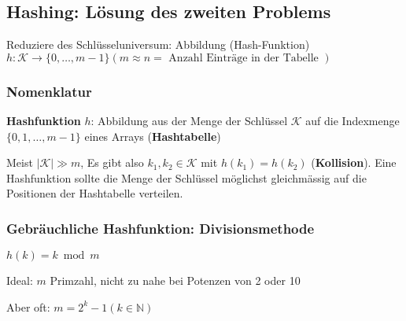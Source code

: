 \documentclass[german]{latex4ei/latex4ei_sheet}
\begin{document}
\begin{sectionbox}
\subsection{Hashing: Lösung des zweiten Problems}\smallskip
Reduziere des Schlüsseluniversum: Abbildung (Hash-Funktion) $h: \mathcal{K} \rightarrow\{0, \ldots, m-1\}(m \approx n=\text { Anzahl Einträge in der Tabelle })$\par\vspace{7px}

\subsubsection{Nomenklatur}\par\smallskip
\textbf{Hashfunktion} $h$: Abbildung aus der Menge der Schlüssel $\mathcal{K}$ auf die Indexmenge $\{0,1, \ldots, m-1\}$ eines Arrays (\textbf{Hashtabelle})\par
Meist $|\mathcal{K}| \gg m$, Es gibt also $k_{1}, k_{2} \in \mathcal{K}$ mit $h\left(k_{1}\right)=h\left(k_{2}\right)$ (\textbf{Kollision}). Eine Hashfunktion sollte die Menge der Schlüssel möglichst gleichmässig auf die Positionen der Hashtabelle verteilen.\par\vspace{7px}

\subsubsection{Gebräuchliche Hashfunktion: Divisionsmethode}\par\smallskip
\begin{center}
    $h(k)=k \bmod m$
\end{center}
Ideal: $m$ Primzahl, nicht zu nahe bei Potenzen von 2 oder 10\par
Aber oft: $m=2^{k}-1(k \in \mathbb{N})$
\end{sectionbox}
\end{document}
